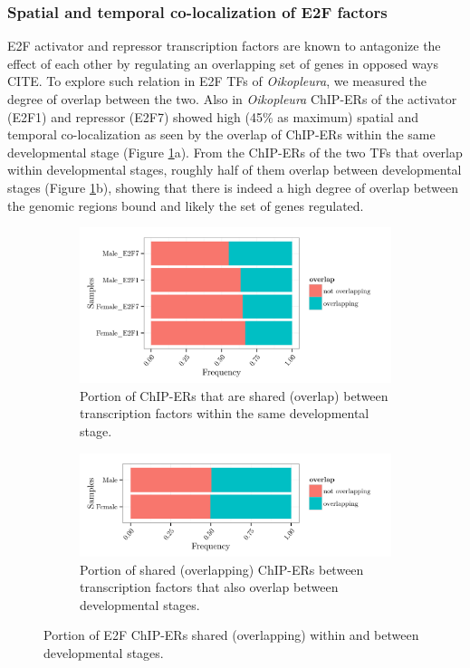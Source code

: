 \documentclass[11pt,twoside,a4paper]{report}
\begin{document}
		\subsubsection{Spatial and temporal co-localization of E2F factors}
		E2F activator and repressor transcription factors are known to antagonize the effect of each other by regulating an overlapping set of genes in opposed ways CITE. To explore such relation in E2F TFs of \textit{Oikopleura}, we measured the degree of overlap between the two. Also in \textit{Oikopleura} ChIP-ERs of the activator (E2F1) and repressor (E2F7) showed high (45\% as maximum) spatial and temporal co-localization as seen by the overlap of ChIP-ERs within the same developmental stage (Figure \ref{fig:E2F_colocalization}a). From the ChIP-ERs of the two TFs that overlap within developmental stages, roughly half of them overlap between developmental stages (Figure \ref{fig:E2F_colocalization}b), showing that there is indeed a high degree of overlap between the genomic regions bound and likely the set of genes regulated.
    	
		\begin{figure}[here]
			\setlength{\belowcaptionskip}{5pt}
			\centering
			\begin{subfigure}[b]{1\textwidth}
				\centering
				\includegraphics[width=0.75\linewidth]{pngs/E2F_overlap.png}
				\caption{Portion of ChIP-ERs that are shared (overlap) between transcription factors within the same developmental stage.}
			\end{subfigure}
			\begin{subfigure}[b]{1\textwidth}
				\centering
				\includegraphics[width=0.75\linewidth]{pngs/E2F_overlap_overlaps.png}
				\caption{Portion of shared (overlapping) ChIP-ERs between transcription factors that also overlap between developmental stages.}
			\end{subfigure}
			\caption[Portion of E2F ChIP-ERs shared within and between developmental stages]
			{Portion of E2F ChIP-ERs shared (overlapping) within and between developmental stages.}
			\label{fig:E2F_colocalization}
		\end{figure}
		
\end{document}
